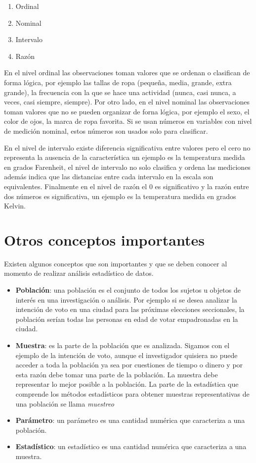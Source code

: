 \documentclass[letterpaper,]{book}
\providecommand{\tightlist}{%
  \setlength{\itemsep}{0pt}\setlength{\parskip}{0pt}}
\begin{document}
\begin{enumerate}
\def\labelenumi{\arabic{enumi}.}
\tightlist
\item
  Ordinal
\item
  Nominal
\item
  Intervalo
\item
  Razón
\end{enumerate}

En el nivel ordinal las observaciones toman valores que se ordenan o clasifican de forma lógica, por ejemplo las tallas de ropa (pequeña, media, grande, extra grande), la frecuencia con la que se hace una actividad (nunca, casi nunca, a veces, casi siempre, siempre). Por otro lado, en el nivel nominal las observaciones toman valores que no se pueden organizar de forna lógica, por ejemplo el sexo, el color de ojos, la marca de ropa favorita. Si se usan números en variables con nivel de medición nominal, estos números son usados solo para clasificar.

En el nivel de intervalo existe diferencia significativa entre valores pero el cero no representa la ausencia de la característica un ejemplo es la temperatura medida en grados Farenheit, el nivel de intervalo no solo clasifica y ordena las mediciones además indica que las distancias entre cada intervalo en la escala son equivalentes. Finalmente en el nivel de razón el 0 es significativo y la razón entre dos números es significativa, un ejemplo es la temperatura medida en grados Kelvin.

\hypertarget{otros-conceptos-importantes}{%
\section{Otros conceptos importantes}\label{otros-conceptos-importantes}}

Existen algunos conceptos que son importantes y que se deben conocer al momento de realizar análisis estadístico de datos.

\begin{itemize}
\tightlist
\item
  \textbf{Población}: una población es el conjunto de todos los sujetos u objetos de interés en una investigación o análisis. Por ejemplo si se desea analizar la intención de voto en una ciudad para las próximas elecciones seccionales, la población serían todas las personas en edad de votar empadronadas en la ciudad.
\item
  \textbf{Muestra}: es la parte de la población que es analizada. Sigamos con el ejemplo de la intención de voto, aunque el investigador quisiera no puede acceder a toda la población ya sea por cuestiones de tiempo o dinero y por esta razón debe tomar una parte de la población. La muestra debe representar lo mejor posible a la población. La parte de la estadística que comprende los métodos estadísticos para obtener muestras representativas de una población se llama \emph{muestreo}
\item
  \textbf{Parámetro}: un parámetro es una cantidad numérica que caracteriza a una población.
\item
  \textbf{Estadístico}: un estadístico es una cantidad numérica que caracteriza a una muestra.
\end{itemize}
\end{document}
